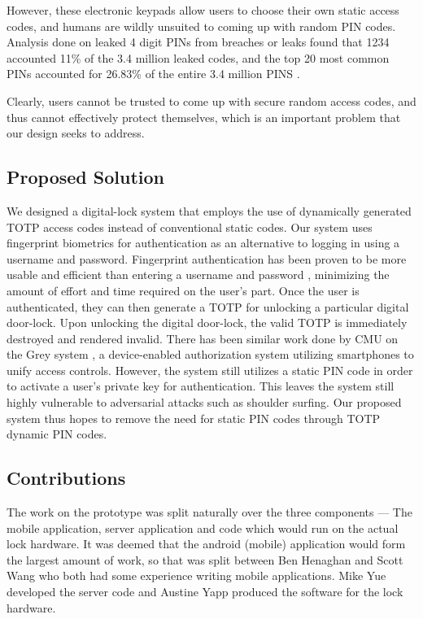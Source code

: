 \documentclass[conference]{IEEEtran}
\begin{document}
	However, these electronic keypads allow users to choose their own static access codes, and humans are wildly unsuited to coming up with random PIN codes. Analysis done on leaked 4 digit PINs from breaches or leaks found that 1234 accounted 11\% of the 3.4 million leaked codes, and the top 20 most common PINs accounted for 26.83\% of the entire 3.4 million PINS \cite{b1}.
	
	Clearly, users cannot be trusted to come up with secure random access codes, and thus cannot effectively protect themselves, which is an important problem that our design seeks to address.


\subsection{Proposed Solution}
	We designed a digital-lock system that employs the use of dynamically generated TOTP access codes instead of conventional static codes. Our system uses fingerprint biometrics for authentication as an alternative to logging in using a username and password. Fingerprint authentication has been proven to be more usable and efficient than entering a username and password \cite{ab2}, minimizing the amount of effort and time required on the user’s part. Once the user is authenticated, they can then generate a TOTP for unlocking a particular digital door-lock. Upon unlocking the digital door-lock, the valid TOTP is immediately destroyed and rendered invalid. 
	There has been similar work done by CMU on the Grey system \cite{ab3}, a device-enabled authorization system utilizing smartphones to unify access controls. However, the system still utilizes a static PIN code in order to activate a user’s private key for authentication. This leaves the system still highly vulnerable to adversarial attacks such as shoulder surfing. Our proposed system thus hopes to remove the need for static PIN codes through TOTP dynamic PIN codes. 

\subsection{Contributions}
The work on the prototype was split naturally over the three components --- The mobile application, server application and code which would run on the actual lock hardware.
It was deemed that the android (mobile) application would form the largest amount of work, so that was split between Ben Henaghan and Scott Wang who both had some experience writing mobile applications.
Mike Yue developed the server code and Austine Yapp produced the software for the lock hardware.
\end{document}
